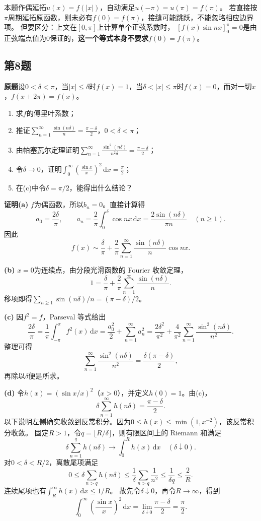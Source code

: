 \documentclass[11pt,a4paper]{ctexart}
\newcommand{\dd}{\,\mathrm d}
\newcommand{\proofstart}{\par\noindent\textbf{证明}\quad}
\begin{document}
本题作偶延拓$u(x)=f(|x|)$，自动满足$u(-\pi)=u(\pi)=f(\pi)$。
若直接按$\pi$周期延拓原函数，则未必有$f(0)=f(\pi)$，接缝可能跳跃，不能忽略相应边界项。
但要区分：上文在$[0,\pi]$上计算单个正弦系数时，
$[f(x)\sin nx]_0^\pi=0$是由正弦端点值为$0$保证的，\textbf{这一个等式本身不要求$f(0)=f(\pi)$}。

\subsection{第8题}
\noindent\textbf{原题}\quad 设$0<\delta<\pi$，当$|x|\le\delta$时$f(x)=1$，当$\delta<|x|\le\pi$时$f(x)=0$，而对一切$x$，$f(x+2\pi)=f(x)$。
\begin{enumerate}
 \item[(a)] 求$f$的傅里叶系数；
 \item[(b)] 推证$\displaystyle\sum_{n=1}^{\infty}\frac{\sin(n\delta)}n=\frac{\pi-\delta}{2}$，$0<\delta<\pi$；
 \item[(c)] 由帕塞瓦尔定理证明$\displaystyle\sum_{n=1}^{\infty}\frac{\sin^2(n\delta)}{n^2\delta}=\frac{\pi-\delta}{2}$；
 \item[(d)] 令$\delta\to0$，证明$\displaystyle\int_0^\infty\left(\frac{\sin x}{x}\right)^2\dd x=\frac\pi2$；
 \item[(e)] 在(c)中令$\delta=\pi/2$，能得出什么结论？
\end{enumerate}

\proofstart \textbf{(a)} $f$为偶函数，所以$b_n=0$。直接计算得
\[
 a_0=\frac{2\delta}\pi,\qquad
 a_n=\frac2\pi\int_0^\delta\cos nx\dd x
 =\frac{2\sin(n\delta)}{\pi n}\quad(n\ge1).
\]
因此
\[
 f(x)\sim\frac\delta\pi+\frac2\pi
 \sum_{n=1}^{\infty}\frac{\sin(n\delta)}n\cos nx.
\]

\textbf{(b)} $x=0$为连续点，由分段光滑函数的 Fourier 收敛定理，
\[
 1=\frac\delta\pi+\frac2\pi\sum_{n=1}^{\infty}\frac{\sin(n\delta)}n.
\]
移项即得$\sum_{n\ge1}\sin(n\delta)/n=(\pi-\delta)/2$。

\textbf{(c)} 因$f^2=f$，Parseval 等式给出
\[
 \frac{2\delta}\pi
 =\frac1\pi\int_{-\pi}^{\pi}f^2(x)\dd x
 =\frac{a_0^2}{2}+\sum_{n=1}^{\infty}a_n^2
 =\frac{2\delta^2}{\pi^2}+\frac4{\pi^2}
       \sum_{n=1}^{\infty}\frac{\sin^2(n\delta)}{n^2}.
\]
整理可得
\[
 \sum_{n=1}^{\infty}\frac{\sin^2(n\delta)}{n^2}
 =\frac{\delta(\pi-\delta)}2,
\]
再除以$\delta$便是所求。

\textbf{(d)} 令$h(x)=(\sin x/x)^2$（$x>0$），并定义$h(0)=1$。由(c)，
\[
 \delta\sum_{n=1}^{\infty}h(n\delta)=\frac{\pi-\delta}{2}.
\]
以下说明左侧确实收敛到反常积分。因为$0\le h(x)\le\min(1,x^{-2})$，该反常积分收敛。
固定$R>1$，令$q=\lfloor R/\delta\rfloor$，则有限区间上的 Riemann 和满足
\[
 \delta\sum_{n=1}^{q}h(n\delta)\longrightarrow\int_0^R h(x)\dd x
 \quad(\delta\downarrow0).
\]
对$0<\delta<R/2$，离散尾项满足
\[
 0\le\delta\sum_{n>q}h(n\delta)
 \le\frac1\delta\sum_{n>q}\frac1{n^2}
 \le\frac1{\delta q}\le\frac2R.
\]
连续尾项也有$\int_R^\infty h(x)\dd x\le1/R$。
故先令$\delta\downarrow0$，再令$R\to\infty$，得到
\[
 \int_0^\infty\left(\frac{\sin x}{x}\right)^2\dd x
 =\lim_{\delta\downarrow0}\frac{\pi-\delta}{2}=\frac\pi2.
\]
\end{document}
